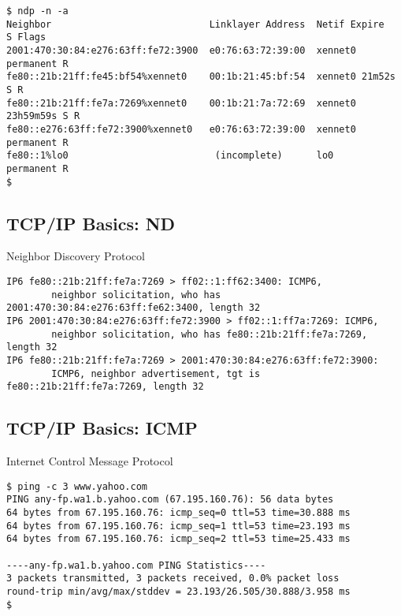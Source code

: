 \documentclass[xga]{xdvislides}
\begin{document}
\begin{verbatim}
$ ndp -n -a
Neighbor                            Linklayer Address  Netif Expire      S Flags
2001:470:30:84:e276:63ff:fe72:3900  e0:76:63:72:39:00  xennet0 permanent R
fe80::21b:21ff:fe45:bf54%xennet0    00:1b:21:45:bf:54  xennet0 21m52s    S R
fe80::21b:21ff:fe7a:7269%xennet0    00:1b:21:7a:72:69  xennet0 23h59m59s S R
fe80::e276:63ff:fe72:3900%xennet0   e0:76:63:72:39:00  xennet0 permanent R
fe80::1%lo0                          (incomplete)      lo0     permanent R
$
\end{verbatim}

\subsection{TCP/IP Basics: ND}
\begin{center}
Neighbor Discovery Protocol
\end{center}
\vspace{.2in}
\begin{verbatim}
IP6 fe80::21b:21ff:fe7a:7269 > ff02::1:ff62:3400: ICMP6,
        neighbor solicitation, who has 2001:470:30:84:e276:63ff:fe62:3400, length 32
IP6 2001:470:30:84:e276:63ff:fe72:3900 > ff02::1:ff7a:7269: ICMP6,
        neighbor solicitation, who has fe80::21b:21ff:fe7a:7269, length 32
IP6 fe80::21b:21ff:fe7a:7269 > 2001:470:30:84:e276:63ff:fe72:3900:
        ICMP6, neighbor advertisement, tgt is fe80::21b:21ff:fe7a:7269, length 32
\end{verbatim}

\subsection{TCP/IP Basics: ICMP}
\begin{center}
Internet Control Message Protocol
\end{center}
\vspace{.2in}

\begin{verbatim}
$ ping -c 3 www.yahoo.com
PING any-fp.wa1.b.yahoo.com (67.195.160.76): 56 data bytes
64 bytes from 67.195.160.76: icmp_seq=0 ttl=53 time=30.888 ms
64 bytes from 67.195.160.76: icmp_seq=1 ttl=53 time=23.193 ms
64 bytes from 67.195.160.76: icmp_seq=2 ttl=53 time=25.433 ms

----any-fp.wa1.b.yahoo.com PING Statistics----
3 packets transmitted, 3 packets received, 0.0% packet loss
round-trip min/avg/max/stddev = 23.193/26.505/30.888/3.958 ms
$
\end{verbatim}
\end{document}
